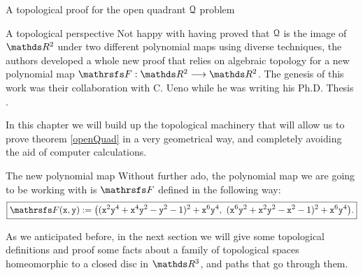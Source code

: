 \documentclass[11pt, a4paper, english, twoside, notitlepage, openright]{report}
\begin{document}
\begin{chapter}{A topological proof for the open quadrant $\mathcal{Q}$ problem}
\begin{section}{A topological perspective}
Not happy with having proved that $\mathcal{Q}$ is the image of $\R^2$ under two different polynomial maps using diverse techniques, the authors developed a whole new proof that relies on algebraic topology for a new polynomial map $\FFF: \R^2 \longrightarrow \R^2$. The genesis of this work was their collaboration with C. Ueno while he was writing his Ph.D. Thesis \cite{u}.

In this chapter we will build up the topological machinery that will allow us to prove theorem \ref{openQuad} in a very geometrical way, and completely avoiding the aid of computer calculations.
\begin{subsection}{The new polynomial map}
Without further ado, the polynomial map we are going to be working with is $\FFF$ defined in the following way:
\begin{equation*}
\boxed{
\FFF({\tt x}, {\tt y}) := \big(({\tt x}^2{\tt y}^4+{\tt x}^4{\tt y}^2-{\tt y}^2-1)^2+{\tt x}^6{\tt y}^4,\ ({\tt x}^6{\tt y}^2+{\tt x}^2{\tt y}^2-{\tt x}^2-1)^2+{\tt x}^6{\tt y}^4\big).
}
\end{equation*}

As we anticipated before, in the next section we will give some topological definitions and proof some facts about a family of topological spaces homeomorphic to a closed disc in $\R^3$, and paths that go through them.


\end{subsection}
\end{section}
\end{chapter}
\end{document}
